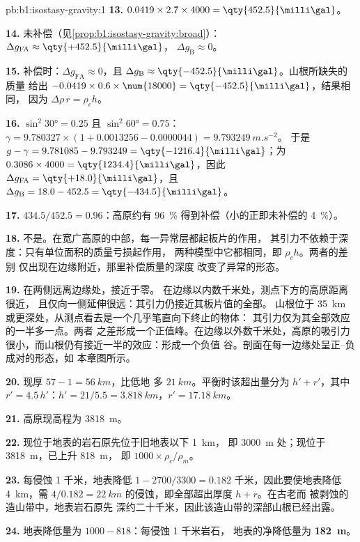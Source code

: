 \begin{solution}{pb:b1:isostasy-gravity:1}
\textbf{13.} $0.0419\times2.7\times4000 = \qty{452.5}{\milli\gal}$。

\textbf{14.} 未补偿（见\cref{prop:b1:isostasy-gravity:broad}）：
$\Delta g_{\mathrm{FA}} \approx \qty{+452.5}{\milli\gal}$，
$\Delta g_{\mathrm B} \approx 0$。

\textbf{15.} 补偿时：$\Delta g_{\mathrm{FA}} \approx 0$，且
$\Delta g_{\mathrm B} \approx \qty{-452.5}{\milli\gal}$。山根所缺失的质量
给出 $-0.0419\times0.6\times\num{18000} = \qty{-452.5}{\milli\gal}$，结果相同，
因为 $\Delta\rho\,r = \rho_c h$。

\textbf{16.} $\sin^2\ang{30} = 0.25$ 且 $\sin^2\ang{60} = 0.75$：
$\gamma = 9.780327\times(1 + 0.0013256 - 0.0000044) = \qty{9.793249}{m.s^{-2}}$。
于是 $g - \gamma = 9.781085 - 9.793249 = \qty{-1216.4}{\milli\gal}$；为 $0.3086\times4000 = \qty{1234.4}{\milli\gal}$，因此
$\Delta g_{\mathrm{FA}} = \qty{+18.0}{\milli\gal}$，且
$\Delta g_{\mathrm B} = 18.0 - 452.5 = \qty{-434.5}{\milli\gal}$。

\textbf{17.} $434.5/452.5 = 0.96$：高原约有 \qty{96}{\percent}
得到补偿（小的正即未补偿的
\qty{4}{\percent}）。

\textbf{18.} 不是。在宽广高原的中部，每一异常层都起板片的作用，
其引力不依赖于深度：只有单位面积的质量亏损起作用，
两种模型中它都相同，即 $\rho_c h$。两者的差别
仅出现在边缘附近，那里补偿质量的深度
改变了异常的形态。

\textbf{19.} 在两侧远离边缘处，接近于零。
在边缘以内数千米处，测点下方的高原距离很近，
且仅向一侧延伸很远：其引力仍接近其板片值的全部。
山根位于 \qty{35}{km} 或更深处，从测点看去是一个几乎笔直向下终止的物体：
其引力仅为其全部效应的一半多一点。两者
之差形成一个正值峰。在边缘以外数千米处，高原的吸引力
很小，而山根仍有接近一半的效应：形成一个负值
谷。剖面在每一边缘处呈正–负成对的形态，如
本章图所示。

\textbf{20.} 现厚 $57 - 1 = \qty{56}{km}$，比低地
多 $\qty{21}{km}$。平衡时该超出量分为 $h' + r'$，其中
$r' = 4.5\,h'$：$h' = 21/5.5 = \qty{3.818}{km}$，$r' = \qty{17.18}{km}$。

\textbf{21.} 高原现高程为 \qty{3818}{m}。

\textbf{22.} 现位于地表的岩石原先位于旧地表以下 \qty{1}{km}，
即 \qty{3000}{m} 处；现位于 \qty{3818}{m}，已上升 \qty{818}{m}，
即 $1000\times\rho_c/\rho_m$。

\textbf{23.} 每侵蚀 1 千米，地表降低 $1 - 2700/3300 =
0.182$ 千米，因此要使地表降低 \qty{4}{km}，需
$4/0.182 = \qty{22}{km}$ 的侵蚀，即全部超出厚度 $h + r$。在古老而
被剥蚀的造山带中，地表岩石原先
深约二十千米，因此该造山带的深部山根已经出露。

\textbf{24.} 地表降低量为 $1000 - 818$：每侵蚀 1 千米岩石，
地表的净降低量为
\textbf{\qty[text-series-to-math=true]{182}{m}}。
\end{solution}
